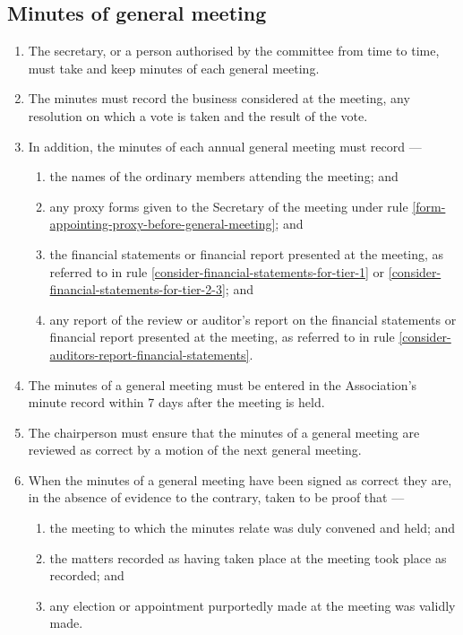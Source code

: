 \documentclass[../constitution.tex]{subfiles}
\begin{document}
\hypertarget{minutes-of-general-meeting}{%
\subsection{Minutes of general meeting}\label{minutes-of-general-meeting}}

\begin{enumerate}

\item The secretary, or a person authorised by the committee from time to time, must take and keep minutes of each general meeting.
\item The minutes must record the business considered at the meeting, any resolution on which a vote is taken and the result of the vote.
\item In addition, the minutes of each annual general meeting must record ---

  \begin{enumerate}
  
  \item the names of the ordinary members attending the meeting; and
  \item any proxy forms given to the Secretary of the meeting under rule \ref{form-appointing-proxy-before-general-meeting}; and
  \item the financial statements or financial report presented at the meeting, as referred to in rule \ref{consider-financial-statements-for-tier-1} or \ref{consider-financial-statements-for-tier-2-3}; and
  \item any report of the review or auditor's report on the financial statements or financial report presented at the meeting, as referred to in rule \ref{consider-auditors-report-financial-statements}.
  \end{enumerate}
\item The minutes of a general meeting must be entered in the Association's minute record within 7 days  after the meeting is held.
\item The chairperson must ensure that the minutes of a general meeting are reviewed as correct by a motion of the next general meeting. 
\item When the minutes of a general meeting have been signed  as correct they are, in the absence of evidence to the contrary, taken to be proof that ---

  \begin{enumerate}
  
  \item the meeting to which the minutes relate was duly convened and held; and
  \item the matters recorded as having taken place at the meeting took place as recorded; and
  \item any election or appointment purportedly made at the meeting was validly made.
  \end{enumerate}
\end{enumerate}
\end{document}
